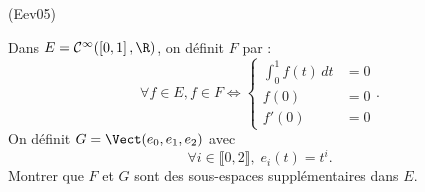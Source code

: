 \begin{tiny}(Eev05)\end{tiny} Dans $E = \mathcal{C}^{\infty}(\left[0,1\right] , \R )$, on définit $F$ par :
\[
 \forall f \in E, f\in F
 \Leftrightarrow
 \left\lbrace 
 \begin{aligned}
  \int_0^1f(t)\,dt &= 0 \\
  f(0) &= 0 \\
  f'(0)&= 0
 \end{aligned}
\right. .
\]
On définit $G = \Vect(e_0, e_1, e_2)$ avec 
\[
 \forall i \in \llbracket 0, 2 \rrbracket, \; e_i(t) = t^i.
\]
Montrer que $F$ et $G$ sont des sous-espaces supplémentaires dans $E$.
